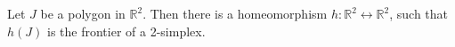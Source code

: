 Let $J$ be a polygon in $\mathbb{R}^2$. Then there is a homeomorphism $h: \mathbb{R}^2 \leftrightarrow \mathbb{R}^2$, such that $h(J)$ is the frontier of a 2-simplex.
